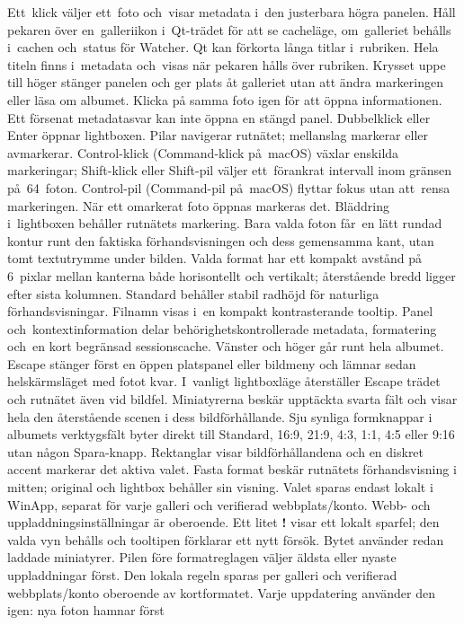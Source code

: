 \documentclass[11pt,a4paper]{article}
\begin{document}
Ett~klick väljer ett~foto och~visar metadata i~den justerbara högra panelen.
Håll pekaren över en~galleriikon i~Qt-trädet för att se cacheläge,
om~galleriet behålls i~cachen och~status för Watcher.
Qt kan förkorta långa titlar i~rubriken. Hela titeln finns i~metadata och~visas
när pekaren hålls över rubriken.
Krysset uppe till höger stänger panelen och ger plats åt galleriet utan att
ändra markeringen eller läsa om albumet. Klicka på samma foto igen för att
öppna informationen. Ett försenat metadatasvar kan inte öppna en stängd panel.
Dubbelklick eller Enter öppnar lightboxen. Pilar navigerar rutnätet;
mellanslag markerar eller avmarkerar. Control-klick (Command-klick på~macOS)
växlar enskilda markeringar; Shift-klick eller Shift-pil väljer ett~förankrat
intervall inom gränsen på~64~foton. Control-pil (Command-pil på~macOS) flyttar
fokus utan att~rensa markeringen. När ett omarkerat foto öppnas markeras det.
Bläddring i~lightboxen behåller rutnätets markering.
Bara valda foton får~en lätt rundad kontur
runt den faktiska förhandsvisningen och dess gemensamma kant, utan tomt
textutrymme under bilden. Valda format har ett kompakt avstånd på 6~pixlar
mellan kanterna både horisontellt och vertikalt; återstående bredd ligger efter
sista kolumnen. Standard behåller stabil radhöjd för naturliga förhandsvisningar.
Filnamn visas i~en kompakt kontrasterande tooltip. Panel och~kontextinformation
delar behörighetskontrollerade metadata, formatering och~en kort begränsad
sessionscache.
Vänster och höger går runt hela albumet. Escape stänger först en öppen
platspanel eller bildmeny och lämnar sedan helskärmsläget med fotot kvar.
I~vanligt lightboxläge återställer Escape trädet och rutnätet även vid bildfel.
Miniatyrerna beskär upptäckta svarta fält och visar hela den återstående scenen
i dess bildförhållande. Sju synliga formknappar i albumets verktygsfält
byter direkt till Standard, 16:9, 21:9, 4:3, 1:1, 4:5 eller 9:16 utan någon
Spara-knapp. Rektanglar visar bildförhållandena och en diskret accent markerar
det aktiva valet. Fasta format beskär rutnätets förhandsvisning i mitten;
original och lightbox behåller sin visning. Valet sparas endast lokalt
i WinApp, separat för varje galleri och verifierad webbplats/konto.
Webb- och uppladdningsinställningar är oberoende. Ett litet \textbf{!}
visar ett lokalt sparfel; den valda vyn behålls och tooltipen förklarar
ett nytt försök. Bytet använder redan laddade miniatyrer.
Pilen före formatreglagen väljer äldsta eller nyaste uppladdningar först.
Den lokala regeln sparas per galleri och verifierad webbplats/konto oberoende
av kortformatet. Varje uppdatering använder den igen: nya foton hamnar först
\end{document}
